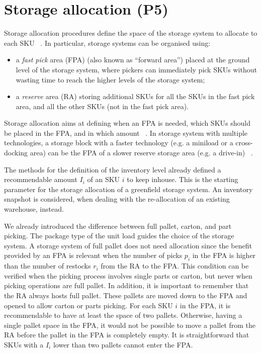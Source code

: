 \section{Storage allocation (P5)} \label{secWhAllocation}
Storage allocation procedures define the space of the storage system to allocate to each SKU ~\cite{Bartholdi2008, Battista2014, Bottani2012, Guerriero2015, Hassini2008, VanDenBerg1998, Walter2013, Yu2015}. In particular, storage systems can be organised using:

\begin{itemize}
    \item a \textit{fast pick} area (FPA) (also known as “forward area”) placed at the ground level of the storage system, where pickers can immediately pick SKUs without wasting time to reach the higher levels of the storage system;
    \item a \textit{reserve} area (RA) storing additional SKUs for all the SKUs in the fast pick area, and all the other SKUs (not in the fast pick area).

\end{itemize}

Storage allocation aims at defining when an FPA is needed, which SKUs should be placed in the FPA, and in which amount ~\cite{Walter2013}. In storage system with multiple technologies, a storage block with a faster technology (e.g. a miniload or a cross-docking area) can be the FPA of a slower reserve storage area (e.g. a drive-in) ~\cite{Hackman1990, Li2009}.\par

The methods for the definition of the inventory level already defined a recommendable amount $I_i$ of an SKU $i$ to keep inhouse. This is the starting parameter for the storage allocation of a greenfield storage system. An inventory snapshot is considered, when dealing with the re-allocation of an existing warehouse, instead. \par

We already introduced the difference between full pallet, carton, and part picking. The package type of the unit load guides the choice of the storage system. A storage system of full pallet does not need allocation since the benefit provided by an FPA is relevant when the number of picks $p_i$ in the FPA is higher than the number of restocks $r_i$ from the RA to the FPA. This condition can be verified when the picking process involves single parts or carton, but never when picking operations are full pallet. In addition, it is important to remember that the RA always hosts full pallet. These pallets are moved down to the FPA and opened to allow carton or parts picking. For each SKU $i$ in the FPA, it is recommendable to have at least the space of two pallets. Otherwise, having a single pallet space in the FPA, it would not be possible to move a pallet from the RA before the pallet in the FPA is completely empty. It is straightforward that SKUs with a $I_i$ lower than two pallets cannot enter the FPA.


